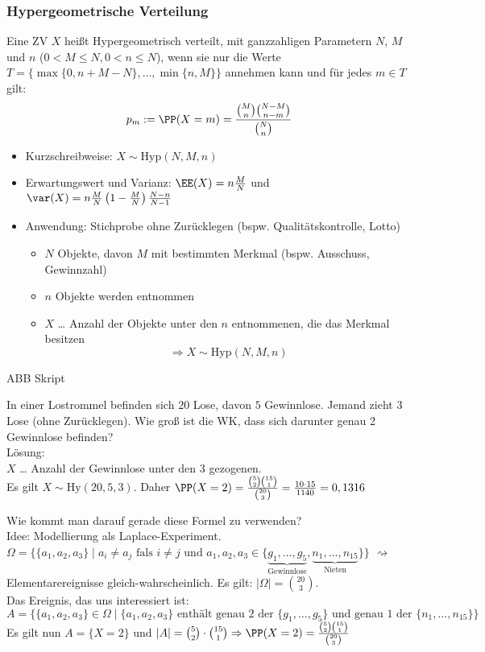 \subsubsection{Hypergeometrische Verteilung}
 Eine ZV $X$ heißt Hypergeometrisch verteilt, mit ganzzahligen Parametern $N$, $M$ und $n$ ($0<M\leq N, 0 < n \leq N$), wenn sie nur die Werte $T=\{\max\{0,n+M-N\}, \dots, \min\{n,M\}\}$ annehmen kann und für jedes $m \in T$ gilt:
$$p_m:=\PP(X=m)=\frac{\binom{M}{n}\binom{N-M}{n-m}}{\binom{N}{n}}$$

\begin{itemize}
\item Kurzschreibweise: $X\sim \mathrm{Hyp}(N,M,n)$
\item Erwartungswert und Varianz: $\EE(X)=n\frac{M}{N}$ und $\var (X)=n\frac{M}{N}\left(1-\frac{M}{N}\right) \frac{N-n}{N-1}$
\item Anwendung: Stichprobe ohne Zurücklegen (bspw. Qualitätskontrolle, Lotto)
\begin{itemize}
\item $N$ Objekte, davon $M$ mit bestimmten Merkmal (bspw. Ausschuss, Gewinnzahl)
\item $n$ Objekte werden entnommen
\item $X$ … Anzahl der Objekte unter den $n$ entnommenen, die das Merkmal besitzen
$$\Rightarrow X\sim \mathrm{Hyp}(N,M,n)$$
\end{itemize}
\end{itemize}
ABB Skript

 In einer Lostrommel befinden sich $20$ Lose, davon $5$ Gewinnlose. Jemand zieht $3$ Lose (ohne Zurücklegen). Wie groß ist die WK, dass sich darunter genau 2 Gewinnlose befinden?\\
Lösung:\\
$X$ … Anzahl der Gewinnlose unter den $3$ gezogenen.\\
Es gilt $X \sim \mathrm{Hy}(20,5,3)$. Daher 
$\PP(X=2)=\frac{\binom{5}{2}\binom{15}{1}}{\binom{20}{3}}=\frac{10 \cdot 15}{1140}=0,1316$

 Wie kommt man darauf gerade diese Formel zu verwenden?\\
Idee: Modellierung als Laplace-Experiment.\\
$\Omega=\{\{a_1,a_2,a_3\}\;|\; a_i \not = a_j \text{ fals } i \not = j \text{ und }a_1, a_2, a_3 \in \{\underbrace{g_1, \dots, g_5}_{\text{Gewinnlose}}, \underbrace{n_1, \dots, n_{15}}_{\text{Nieten}}\}\}$ $\rightsquigarrow $ Elementarereignisse gleich-wahrscheinlich. Es gilt: $|\Omega|=\binom{20}{3}$.\\
Das Ereignis, das uns interessiert ist: \\
$A=\{\{a_1, a_2, a_3\}\in \Omega \;|\; \{a_1, a_2, a_3\} \text{ enthält genau 2 der }\{g_1, \dots,g_5\}\text{ und genau 1 der }\{n_1,\dots,n_{15}\}\}$\\
Es gilt nun $A=\{X=2\}$ und $|A| = \binom{5}{2}\cdot \binom{15}{1} \Rightarrow \PP(X=2) = \frac{\binom{5}{2}\binom{15}{1}}{\binom{20}{3}}$

